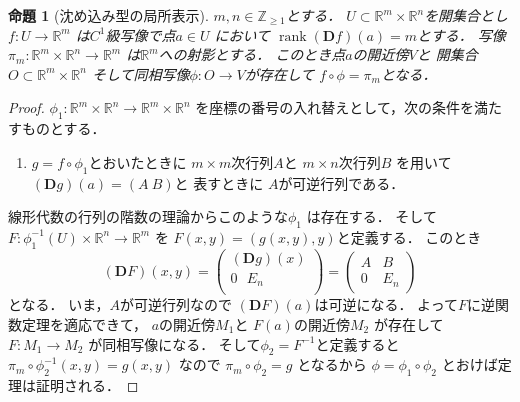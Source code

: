 \documentclass[leqno, a4paper, 12pt]{jsarticle}
\newtheorem{prop}[thm]{命題}
\newcommand{\zz}{\mathbb{Z}}
\newcommand{\rr}{\mathbb{R}}
\DeclareMathOperator{\rank}{rank}
\newcommand{\ddd}{\mathbf{D}}
\begin{document}
\begin{prop}[沈め込み型の局所表示]
$m, n\in \zz_{\ge 1}$とする．
$U\subset \rr^{m}\times \rr^{n}$を開集合とし
$f: U\to \rr^{m}$
は$C^{1}$級写像で点$a\in U$
において
$\rank(\ddd f)(a)=m$とする．
写像$\pi_{m}: \rr^{m}\times \rr^{n}\to \rr^{m}$
は$\rr^{m}$への射影とする．
このとき点$a$の開近傍$V$と
開集合$O\subset \rr^{m}\times\rr^{n}$
そして同相写像$\phi: O\to V$が存在して
$f\circ \phi=\pi_{m}$となる．
\end{prop}
\begin{proof}
$\phi_{1}: \rr^{m}\times \rr^{n}\to \rr^{m}\times \rr^{n}$
を座標の番号の入れ替えとして，次の条件を満たすものとする．
\begin{enumerate}
\item 
$g=f\circ \phi_{1}$とおいたときに
$m\times m$次行列$A$と
$m\times n$次行列$B$
を用いて
$(\ddd g)(a)=(A\  B)$と
表すときに
$A$が可逆行列である．
\end{enumerate}
線形代数の行列の階数の理論からこのような$\phi_{1}$
は存在する．
そして
$F: \phi_{1}^{-1}(U)\times \rr^{n}\to \rr^{m}$
を
$F(x, y)=(g(x, y), y)$と定義する．
このとき
\[
(\ddd F)(x, y)=
\begin{pmatrix}
(\ddd g)(x) \\
0 \ \ \  E_{n} \\
\end{pmatrix}
=
\begin{pmatrix}
A & B\\
0 & E_{n}
\end{pmatrix}
\]
となる．
いま，$A$が可逆行列なので
$(\ddd F)(a)$は可逆になる．
よって$F$に逆関数定理を適応できて，
$a$の開近傍$M_{1}$と
$F(a)$の開近傍$M_{2}$
が存在して$F: M_{1}\to M_{2}$
が同相写像になる．
そして$\phi_{2}=F^{-1}$と定義すると
$\pi_{m}\circ \phi_{2}^{-1}(x, y)=g(x, y)$
なので
$\pi_{m}\circ \phi_{2}=g$
となるから
$\phi=\phi_{1}\circ \phi_{2}$
とおけば定理は証明される．
\end{proof}
\end{document}
